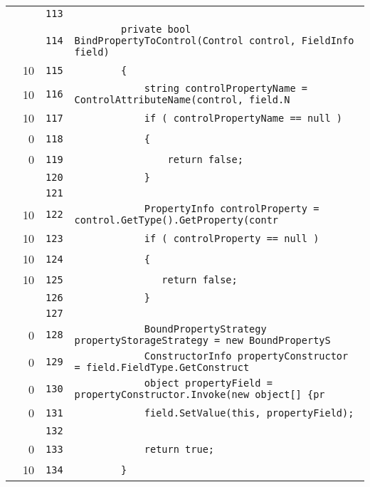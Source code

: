 \documentclass[a4paper,10pt]{article}
\begin{document}
\begin{longtable}[l]{lrrl}
\cellcolor{gray} &  & \verb~113~ & \verb~~\\
\cellcolor{gray} &  & \verb~114~ & \verb~        private bool BindPropertyToControl(Control control, FieldInfo field)~\\
\cellcolor{green} & 10 & \verb~115~ & \verb~        {~\\
\cellcolor{green} & 10 & \verb~116~ & \verb~            string controlPropertyName = ControlAttributeName(control, field.N~\\
\cellcolor{green} & 10 & \verb~117~ & \verb~            if ( controlPropertyName == null )~\\
\cellcolor{red} & 0 & \verb~118~ & \verb~            {~\\
\cellcolor{red} & 0 & \verb~119~ & \verb~                return false;~\\
\cellcolor{gray} &  & \verb~120~ & \verb~            }~\\
\cellcolor{gray} &  & \verb~121~ & \verb~~\\
\cellcolor{green} & 10 & \verb~122~ & \verb~            PropertyInfo controlProperty = control.GetType().GetProperty(contr~\\
\cellcolor{green} & 10 & \verb~123~ & \verb~            if ( controlProperty == null )~\\
\cellcolor{green} & 10 & \verb~124~ & \verb~            {~\\
\cellcolor{green} & 10 & \verb~125~ & \verb~               return false;~\\
\cellcolor{gray} &  & \verb~126~ & \verb~            }~\\
\cellcolor{gray} &  & \verb~127~ & \verb~~\\
\cellcolor{red} & 0 & \verb~128~ & \verb~            BoundPropertyStrategy propertyStorageStrategy = new BoundPropertyS~\\
\cellcolor{red} & 0 & \verb~129~ & \verb~            ConstructorInfo propertyConstructor = field.FieldType.GetConstruct~\\
\cellcolor{red} & 0 & \verb~130~ & \verb~            object propertyField = propertyConstructor.Invoke(new object[] {pr~\\
\cellcolor{red} & 0 & \verb~131~ & \verb~            field.SetValue(this, propertyField);~\\
\cellcolor{gray} &  & \verb~132~ & \verb~~\\
\cellcolor{red} & 0 & \verb~133~ & \verb~            return true;~\\
\cellcolor{green} & 10 & \verb~134~ & \verb~        }~\\

\end{longtable}
\end{document}
